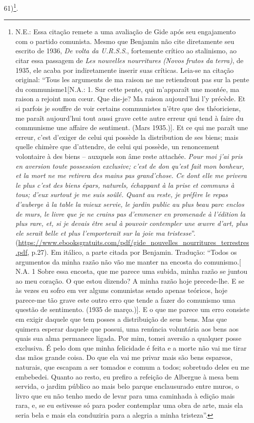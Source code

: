 61)\footnote{N.E.: Essa citação remete a uma avaliação de Gide após seu
  engajamento com o partido comunista. Mesmo que Benjamin não cite
  diretamente seu escrito de 1936, \emph{De volta da U.R.S.S}.,
  fortemente crítico ao stalinismo, ao citar essa passagem de \emph{Les
  nouvelles nourritures} \emph{(Novos frutos da terra)}, de 1935, ele
  acaba por indiretamente inserir suas críticas. Leia-se na citação
  original: ``Tous les arguments de ma raison ne me retiendront pas sur
  la pente du communisme1{[}N.A.: 1. Sur cette pente, qui m'apparaît une
  montée, ma raison a rejoint mon cœur. Que dis-je? Ma raison
  aujourd'hui l'y précède. Et si parfois je souffre de voir certains
  communistes n'être que des théoriciens, me paraît aujourd'hui tout
  aussi grave cette autre erreur qui tend à faire du communisme une
  affaire de sentiment. (Mars 1935.){]}. Et ce qui me paraît une erreur,
  c'est d'exiger de celui qui possède la distribution de ses biens; mais
  quelle chimère que d'attendre, de celui qui possède, un renoncement
  volontaire à des biens -- auxquels son âme reste attachée. \emph{Pour
  moi j'ai pris en aversion toute possession exclusive; c'est de don
  qu'est fait mon bonheur, et la mort ne me retirera des mains pas
  grand'chose. Ce dont elle me privera le plus c'est des biens épars,
  naturels, échappant à la prise et communs à tous; d'eux surtout je me
  suis soûlé. Quant au reste, je préfère le repas d'auberge à la table
  la mieux servie, le jardin public au plus beau parc enclos de murs, le
  livre que je ne crains pas d'emmener en promenade à l'édition}
  \emph{la plus rare, et, si je devais être seul à pouvoir contempler
  une œuvre d'art, plus ele serait belle et plus l'}\emph{emporterait
  sur la joie ma tristesse}''.
  (\href{https://www.ebooksgratuits.com/pdf/gide_nouvelles_nourritures_terrestres.pdf}{{https://www.ebooksgratuits.com/pdf/gide\_nouvelles\_nourritures\_terrestres.pdf}},
  p.27). Em itálico, a parte citada por Benjamin. Tradução: ``Todos os
  argumentos da minha razão não vão me manter na encosta do
  comunismo.{[} N.A. 1 Sobre essa encosta, que me parece uma subida,
  minha razão se juntou ao meu coração. O que estou dizendo? A minha
  razão hoje precede-lhe. E se às vezes eu sofro em ver alguns
  comunistas sendo apenas teóricos, hoje parece-me tão grave este outro
  erro que tende a fazer do comunismo uma questão de sentimento. (1935
  de março.){]}. E o que me parece um erro consiste em exigir daquele
  que tem posses a distribuição de seus bens. Mas que quimera esperar
  daquele que possui, uma renúncia voluntária aos bens aos quais sua
  alma permanece ligada. Por mim, tomei aversão a qualquer posse
  exclusiva. É pelo dom que minha felicidade é feita e a morte não vai
  me tirar das mãos grande coisa. Do que ela vai me privar mais são bens
  esparsos, naturais, que escapam a ser tomados e comum a todos;
  sobretudo deles eu me embebedei. Quanto ao resto, eu prefiro a
  refeição de Albergue à mesa bem servida, o jardim público ao mais belo
  parque enclausurado entre muros, o livro que eu não tenho medo de
  levar para uma caminhada à edição mais rara, e, se eu estivesse só
  para poder contemplar uma obra de arte, mais ela seria bela e mais ela
  conduziria para a alegria a minha tristeza''.}.

